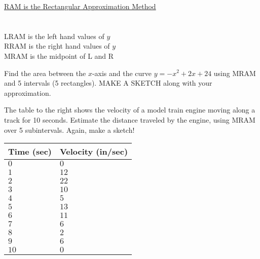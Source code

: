 \documentclass[addpoints, 12pt]{exam}
\newcommand\Tstrut{\rule{0pt}{2.6ex}}         %
\newcommand\Bstrut{\rule[-0.9ex]{0pt}{0pt}}   %
\begin{document}
\begin{questions}
    
    \begin{center}
        \underline{RAM is the Rectangular Approximation Method}\\
        \\
        \\
        LRAM is the left hand values of $y$\\
        RRAM is the right hand values of $y$\\
        MRAM is the midpoint of L and R
    \end{center}
    
    
    
    \question Find the area between the $x$-axis and the curve $y=-x^2+2x+24$ using MRAM and 5 intervals (5 rectangles). MAKE A SKETCH along with your approximation.
    
    \newpage
    
    \begin{minipage}[t]{0.55\linewidth}
    \question The table to the right shows the velocity of a model train engine moving along a track for 10 seconds. Estimate the distance traveled by the engine, using MRAM over 5 subintervals. Again, make a sketch!    
    \end{minipage}
    \hfill
    \begin{minipage}[t]{0.4\linewidth}
    \begin{longtable}[ht]{|C{2.25cm}|C{3cm}|}
        \hline
        Time (sec)\Tstrut\Bstrut & Velocity (in/sec)\Tstrut\Bstrut \\\hline
        $0$\Tstrut\Bstrut & $0$\Tstrut\Bstrut \\\hline
        $1$\Tstrut\Bstrut & $12$\Tstrut\Bstrut \\\hline
        $2$\Tstrut\Bstrut & $22$\Tstrut\Bstrut \\\hline
        $3$\Tstrut\Bstrut & $10$\Tstrut\Bstrut \\\hline
        $4$\Tstrut\Bstrut & $5$\Tstrut\Bstrut \\\hline 
        $5$\Tstrut\Bstrut & $13$\Tstrut\Bstrut \\\hline
        $6$\Tstrut\Bstrut & $11$\Tstrut\Bstrut \\\hline
        $7$\Tstrut\Bstrut & $6$\Tstrut\Bstrut \\\hline
        $8$\Tstrut\Bstrut & $2$\Tstrut\Bstrut \\\hline
        $9$\Tstrut\Bstrut & $6$\Tstrut\Bstrut \\\hline
        $10$\Tstrut\Bstrut & $0$\Tstrut\Bstrut \\\hline
    \end{longtable}    
    \end{minipage}
    


\end{questions}
\end{document}
